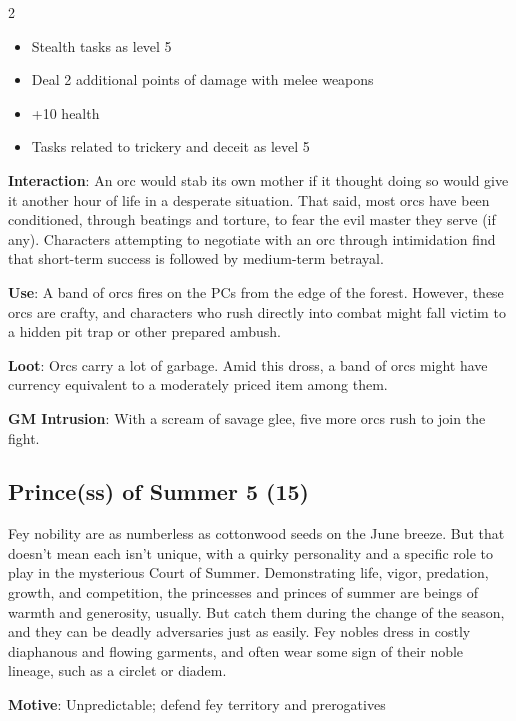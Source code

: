 \begin{multicols}{2}
\begin{itemize}
\item Stealth tasks as level 5
\item Deal 2 additional points of damage with melee weapons
\item +10 health
\item Tasks related to trickery and deceit as level 5
\end{itemize}

\textbf{Interaction}: An orc would stab its own mother if it thought doing so would give it another hour of life in a desperate situation. That said, most orcs have been conditioned, through beatings and torture, to fear the evil master they serve (if any). Characters attempting to negotiate with an orc through intimidation find that short-term success is followed by medium-term betrayal.

\textbf{Use}: A band of orcs fires on the PCs from the edge of the forest. However, these orcs are crafty, and characters who rush directly into combat might fall victim to a hidden pit trap or other prepared ambush.

\textbf{Loot}: Orcs carry a lot of garbage. Amid this dross, a band of orcs might have currency equivalent to a moderately priced item among them.

\textbf{GM Intrusion}: With a scream of savage glee, five more orcs rush to join the fight.

\subsection{Prince(ss) of Summer 5 (15)}

Fey nobility are as numberless as cottonwood seeds on the June breeze. But that doesn’t mean each isn’t unique, with a quirky personality and a specific role to play in the mysterious Court of Summer. Demonstrating life, vigor, predation, growth, and competition, the princesses and princes of summer are beings of warmth and generosity, usually. But catch them during the change of the season, and they can be deadly adversaries just as easily. Fey nobles dress in costly diaphanous and flowing garments, and often wear some sign of their noble lineage, such as a circlet or diadem.

\textbf{Motive}: Unpredictable; defend fey territory and prerogatives


\end{multicols}
